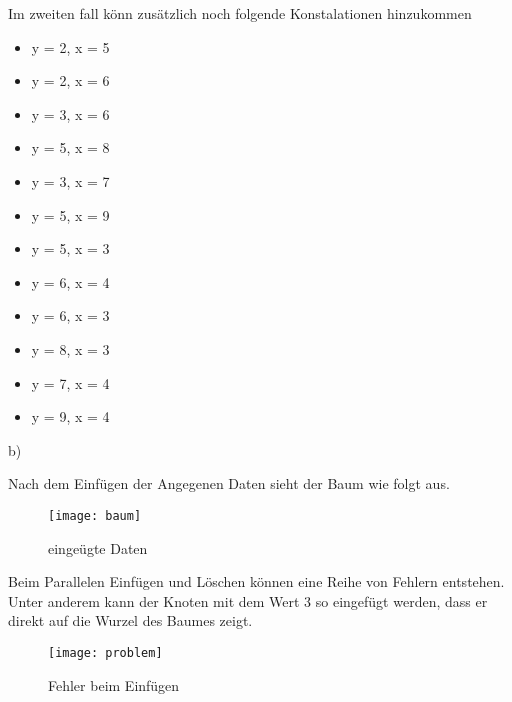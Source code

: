 Im zweiten fall könn zusätzlich noch folgende Konstalationen hinzukommen
\begin{itemize}
	\item[] y = 2, x = 5
	\item[] y = 2, x = 6
	
	\item[] y = 3, x = 6
	\item[] y = 5, x = 8

	\item[] y = 3, x = 7
	\item[] y = 5, x = 9

	\item[] y = 5, x = 3
	\item[] y = 6, x = 4

	\item[] y = 6, x = 3
	\item[] y = 8, x = 3

	\item[] y = 7, x = 4
	\item[] y = 9, x = 4
\end{itemize}

\newpage

b)

Nach dem Einfügen der Angegenen Daten sieht der Baum wie folgt aus.

\begin{figure}[ht]
	\centering
  \texttt{[image: baum]}
	\caption{eingeügte Daten}
	\label{fig1}
\end{figure}

Beim Parallelen Einfügen und Löschen können eine Reihe von Fehlern entstehen. Unter anderem kann der Knoten mit dem Wert 3 so eingefügt werden, dass er direkt auf die Wurzel des Baumes zeigt.

\begin{figure}[ht]
	\centering
  \texttt{[image: problem]}
	\caption{Fehler beim Einfügen}
	\label{fig1}
\end{figure}
